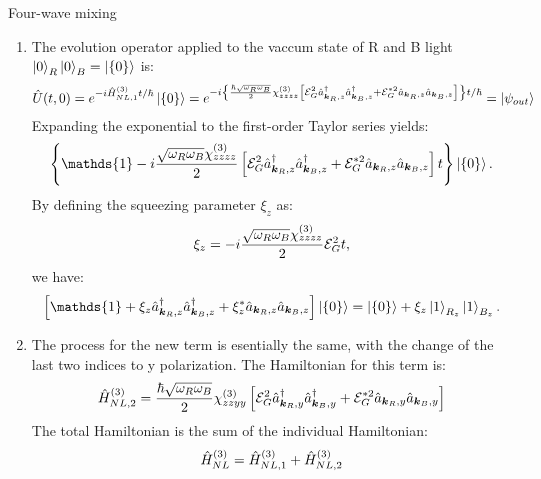 \begin{example}{Four-wave mixing}
\begin{enumerate}[itemsep=0pt,topsep=0pt,parsep=0pt,label=\alph*)]
\begin{align*}
    \pm2kx\mp(\bk_R+\bk_B)&\Longrightarrow\text{Momentum conservation}:2kx=\bk_R+\bk_B.
  \end{align*}
  The difference of blue and red frequencies is still in the optical frequency. The Hamiltonian then reduces to
  \begin{align*}
    \hH_{NL,1}^{(3)}=\frac{\hbar\sqrt{\omega_R\omega_B}}{2}\chi_{zzzz}^{(3)}\left[\E_G^2\ha^\dagger_{\bk_R,z}\ha^\dagger_{\bk_B,z}+\E_G^{*2}\ha_{\bk_R,z}\ha_{\bk_B,z}\right]. 
  \end{align*}
  \item The evolution operator applied to the vaccum state of R and B light $\left|0\right\rangle_R\left|0\right\rangle_B=\left|\{0\}\right\rangle$ is:
  \begin{align*}
    \hat{U}(t,0)=e^{-i\hat{H}_{NL,1}^{(3)}t/\hbar}\left|\{0\}\right\rangle=e^{-i\left\{\frac{\hbar\sqrt{\omega_R\omega_B}}{2}\chi_{zzzz}^{(3)}\left[\mathcal{E}_G^2\hat{a}^\dagger_{\bm{k}_R,z}\hat{a}^\dagger_{\bm{k}_B,z}+\mathcal{E}_G^{*2}\hat{a}_{\bm{k}_R,z}\hat{a}_{\bm{k}_B,z}\right]\right\}t/\hbar}=\left|\psi_{out}\right\rangle
  \end{align*}
  Expanding the exponential to the first-order Taylor series yields:
  \begin{align*}
    \left\{\mathds{1}-i\frac{\sqrt{\omega_R\omega_B}\chi_{zzzz}^{(3)}}{2}\left[\E_G^2\ha^\dagger_{\bk_R,z}\ha^\dagger_{\bk_B,z}+\E_G^{*2}\ha_{\bk_R,z}\ha_{\bk_B,z}\right]t\right\}\ket{\{0\}}.
  \end{align*}
  By defining the squeezing parameter $\xi_z$ as:
  \begin{align*}
    \xi_z=-i\frac{\sqrt{\omega_R\omega_B}\chi_{zzzz}^{(3)}}{2}\mathcal{E}_G^2t,
  \end{align*}
  we have:
  \begin{align*}
    \left[\mathds{1}+\xi_z\ha^\dagger_{\bk_R,z}\ha^\dagger_{\bk_B,z}+\xi^*_z\ha_{\bk_R,z}\ha_{\bk_B,z}\right]\ket{\{0\}}=\ket{\{0\}}+\xi_z\ket{1}_{R_z}\ket{1}_{B_z}.
  \end{align*}
  \item The process for the new term is esentially the same, with the change of 
  the last two indices to y polarization. The Hamiltonian for this term 
  is: 
  \begin{align*}
    \hat{H}^{(3)}_{NL,2}=\frac{\hbar\sqrt{\omega_R\omega_B}}{2}\chi_{zzyy}^{(3)}\left[\mathcal{E}^2_G\hat{a}^\dagger_{\bm{k}_R,y}\hat{a}^\dagger_{\bm{k}_B,y}+\mathcal{E}^{*2}_G\hat{a}_{\bm{k}_R,y}\hat{a}_{\bm{k}_B,y}\right]
  \end{align*}
  The total Hamiltonian is the sum of the individual Hamiltonian:
  \begin{align*}
    \hH_{NL}^{(3)}&=\hH_{NL,1}^{(3)}+\hH_{NL,2}^{(3)}\\

\end{align*}
\end{enumerate}
\end{example}
